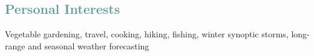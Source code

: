 \documentclass[margin,line,palatino,courier,10pt]{res}
\begin{document}
\begin{resume}

\vspace{-0.1in}
\noindent\makebox[\linewidth][r]{\rule{\textwidth}{5pt}}
\vspace{-0.3in}
\section{\sc \textcolor{CadetBlue}{\large{Personal Interests}}}
Vegetable gardening, travel, cooking, hiking, fishing, winter synoptic storms, long-range and seasonal weather forecasting

\end{resume}
\end{document}
